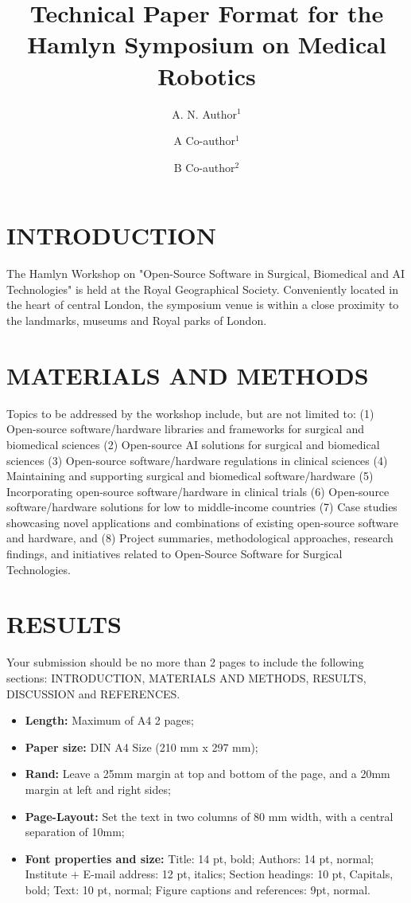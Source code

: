 \documentclass[a4paper, 10 pt, conference]{hsmrw}
\title{\LARGE \bf
Technical Paper Format for the Hamlyn Symposium on Medical Robotics}
\author{\LARGE A. N. Author$^{1}$}
\author{\LARGE A Co-author$^{1}$}
\author{\LARGE B Co-author$^{2}$}
\affil{\Large\textit{$^{1}$Institute for xxx, University XXX,}\\ \Large\textit{$^{2}$Institute for xxx, University Hospital XXX}\\ \Large\textit{a.n.author@abc.edu}}
\begin{document}
\maketitle
\thispagestyle{empty}
\pagestyle{empty}

\section*{INTRODUCTION}
The Hamlyn Workshop on "Open-Source Software in Surgical, Biomedical and AI Technologies" is held at the Royal Geographical Society. Conveniently located in the heart of central London, the symposium venue is within a close proximity to the landmarks, museums and Royal parks of London. 

\section*{MATERIALS AND METHODS}
Topics to be addressed by the workshop include, but are not limited to: (1) Open-source software/hardware libraries and frameworks for surgical and biomedical sciences (2) Open-source AI solutions for surgical and biomedical sciences (3) Open-source software/hardware regulations in clinical sciences (4) Maintaining and supporting surgical and biomedical software/hardware (5) Incorporating open-source software/hardware in clinical trials (6) Open-source software/hardware solutions for low to middle-income countries (7) Case studies showcasing novel applications and combinations of existing open-source software and hardware, and (8) Project summaries, methodological approaches, research findings, and initiatives related to Open-Source Software for Surgical Technologies.


\section*{RESULTS}
Your submission should be no more than 2 pages to include the following sections: INTRODUCTION, MATERIALS AND METHODS, RESULTS, DISCUSSION and REFERENCES.
\begin{itemize}
    \item \textbf{Length:} Maximum of A4 2 pages;
    \item \textbf{Paper size:} DIN A4 Size (210 mm x 297 mm);
    \item \textbf{Rand:} Leave a 25mm margin at top and bottom of the page, and a 20mm margin at left and right sides;
    \item \textbf{Page-Layout:} Set the text in two columns of 80 mm width, with a central separation of 10mm;
    \item \textbf{Font properties and size:} Title: 14 pt, bold; Authors: 14 pt, normal; Institute + E-mail address: 12 pt, italics; Section headings: 10 pt, Capitals, bold; Text: 10 pt, normal; Figure captions and references: 9pt, normal.
\end{itemize}
\end{document}
